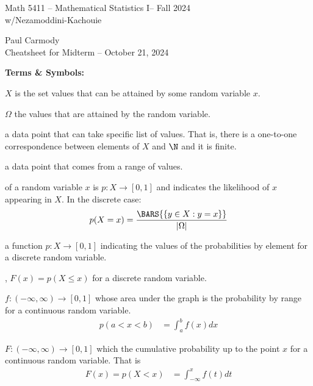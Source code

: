 \documentclass[10pt,a4paper]{report}
\newcommand{\CLASSNAME}{Math 5411 -- Mathematical Statistics I}
\newcommand{\PROFESSOR}{Nezamoddini-Kachouie}
\newcommand{\STUDENTNAME}{Paul Carmody}
\newcommand{\ASSIGNMENT}{Cheatsheet for Midterm }
\newcommand{\DUEDATE}{October 21, 2024}
\newcommand{\SEMESTER}{Fall 2024}
\begin{document}
\begin{center}
	\Large{\CLASSNAME -- \SEMESTER} \\
	\large{w/\PROFESSOR}
\end{center}
\begin{center}
	\STUDENTNAME \\
	\ASSIGNMENT -- \DUEDATE\\
\end{center}

\begin{description}
\item \textbf{Terms \& Symbols:}
	\begin{description}
		\item $X$ is the set values that can be attained by some random variable $x$.
		\item {} $\Omega$ the values that are attained by the random variable.
		\item {} a data point that can take specific list of values.  That is, there is a one-to-one correspondence between elements of $X$ and $\N$ and it is finite.
		\item {} a data point that comes from a range of values.
		\item {} of a random variable $x$ is $p: X \to [0,1]$ and indicates the likelihood of $x$ appearing in $X$.  In the discrete case: 
		\begin{align*}
			p(X=x) = \frac{\BARS{\{y\in X: y=x\}}}{|\Omega|}
		\end{align*}
		\item {} a function $p: X \to [0,1]$ indicating the values of the probabilities by element for a discrete random variable.
		\item {}, $F(x) = p(X\le x)$ for a discrete random variable.
		\item {} $f: (-\infty,\infty) \to [0,1]$ whose area under the graph is the probability by range for a continuous random variable.
		\begin{align*}
			p(a < x < b) &= \int_a^b f(x)dx
		\end{align*}
		\item {} $F: (-\infty,\infty) \to [0,1]$ which the cumulative probability up to the point $x$ for a continuous random variable.  That is
		\begin{align*}
			F(x) = p(X< x) &= \int_{-\infty}^x f(t) dt
		\end{align*}
		

\end{description}
\end{description}
\end{document}
